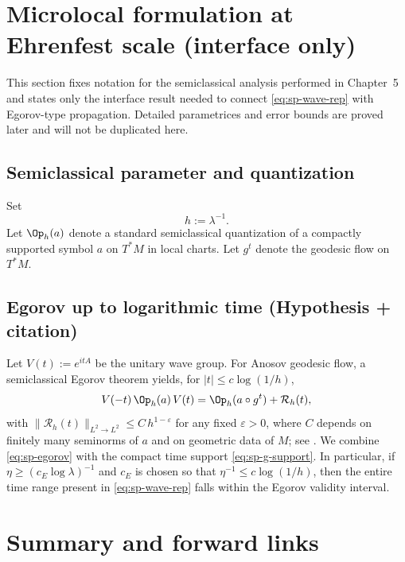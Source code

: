 \section{Microlocal formulation at Ehrenfest scale (interface only)}\label{sec:sp-microlocal}

This section fixes notation for the semiclassical analysis performed in Chapter~5 and states only the interface
result needed to connect \eqref{eq:sp-wave-rep} with Egorov-type propagation. Detailed parametrices and error bounds
are proved later and will not be duplicated here.

\subsection{Semiclassical parameter and quantization}\label{subsec:sp-semiclassical}

Set
\[
h:=\lambda^{-1}.
\]
Let $\Op_h(a)$ denote a standard semiclassical quantization of a compactly supported symbol $a$ on $T^*M$ in local charts.
Let $g^t$ denote the geodesic flow on $T^*M$.

\subsection{Egorov up to logarithmic time (Hypothesis + citation)}\label{subsec:sp-egorov}

Let $V(t):=e^{itA}$ be the unitary wave group. For Anosov geodesic flow, a semiclassical Egorov theorem yields,
for $|t|\le c\log(1/h)$,
\begin{equation}\label{eq:sp-egorov}
V(-t)\,\Op_h(a)\,V(t)=\Op_h(a\circ g^t)+\mathcal R_h(t),
\end{equation}
with $\|\mathcal R_h(t)\|_{L^2\to L^2}\le C\,h^{1-\varepsilon}$ for any fixed $\varepsilon>0$,
where $C$ depends on finitely many seminorms of $a$ and on geometric data of $M$;
see \cite{Anantharaman2008,NonnenmacherZworski2009,Zworski2012}.
We combine \eqref{eq:sp-egorov} with the compact time support \eqref{eq:sp-g-support}. In particular, if
$\eta\ge (c_E\log\lambda)^{-1}$ and $c_E$ is chosen so that $\eta^{-1}\le c\log(1/h)$, then the entire time range
present in \eqref{eq:sp-wave-rep} falls within the Egorov validity interval.

\section{Summary and forward links}\label{sec:sp-summary}

